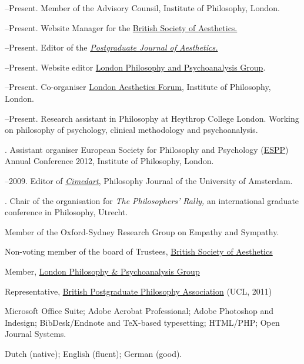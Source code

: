 \documentclass[11pt]{article}
\begin{document}
\medskip

--Present. Member of the Advisory Counsil, Institute of Philosophy, London.

--Present. Website Manager for the \href{http://www.british-aesthetics.org.uk}{British Society of Aesthetics.}

--Present. Editor of the \href{http:\\www.pjaesthetics.org}{\emph{Postgraduate Journal of Aesthetics.}}

--Present. Website editor \href{http://www.philosophy-psychoanalysis.org.uk}{London Philosophy and Psychoanalysis Group}.

--Present. Co-organiser \href{http:\\www.londonaestheticsforum.org}{London Aesthetics Forum}, Institute of Philosophy, London.

--Present. Research assistant in Philosophy at Heythrop College London. Working on philosophy of psychology, clinical methodology and psychoanalysis.

. Assistant organiser European Society for Philosophy and Psychology (\href{http://www.eurospp.org}{ESPP}) Annual Conference 2012, Institute of Philosophy, London. 

--2009. Editor of \href{http://www.cimedart.nl}{\emph{Cimedart}}, Philosophy Journal of the University of Amsterdam.

. Chair of the organisation for \emph{The Philosophers' Rally,} an international graduate conference in Philosophy, Utrecht.

\bigskip 


\ind Member of the Oxford-Sydney Research Group on Empathy and Sympathy. 

\ind Non-voting member of the board of Trustees, \href{http://www.british-aesthetics.org.uk}{British Society of Aesthetics}

\ind Member, \href{http://www.philosophy-psychoanalysis.org.uk}{London Philosophy \& Psychoanalysis Group}

\ind Representative, \href{http://www.bppa-online.org}{British Postgraduate Philosophy Association} (UCL, 2011)

\bigskip

\medskip

\ind Microsoft Office Suite; Adobe Acrobat Professional; Adobe Photoshop and Indesign; BibDesk/Endnote and TeX-based typesetting; HTML/PHP; Open Journal Systems.

\bigskip 

\medskip

\ind Dutch (native); English (fluent); German (good).

\rfoot{\footnotesize{\today}}
\end{document}
